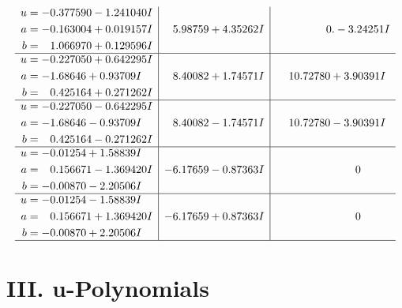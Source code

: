 \documentclass[1p]{elsarticle_modified}
\theoremstyle{definition}
\begin{document}
$$\begin{array}{c|c|c}
\begin{aligned}
u &= -0.377590 - 1.241040 I \\
a &= -0.163004 + 0.019157 I \\
b &= \phantom{-}1.066970 + 0.129596 I\end{aligned}
 & \phantom{-}5.98759 + 4.35262 I & \phantom{-0.000000 } 0. - 3.24251 I \\ \hline\begin{aligned}
u &= -0.227050 + 0.642295 I \\
a &= -1.68646 + 0.93709 I \\
b &= \phantom{-}0.425164 + 0.271262 I\end{aligned}
 & \phantom{-}8.40082 + 1.74571 I & \phantom{-}10.72780 + 3.90391 I \\ \hline\begin{aligned}
u &= -0.227050 - 0.642295 I \\
a &= -1.68646 - 0.93709 I \\
b &= \phantom{-}0.425164 - 0.271262 I\end{aligned}
 & \phantom{-}8.40082 - 1.74571 I & \phantom{-}10.72780 - 3.90391 I \\ \hline\begin{aligned}
u &= -0.01254 + 1.58839 I \\
a &= \phantom{-}0.156671 - 1.369420 I \\
b &= -0.00870 - 2.20506 I\end{aligned}
 & -6.17659 - 0.87363 I & \phantom{-0.000000 } 0 \\ \hline\begin{aligned}
u &= -0.01254 - 1.58839 I \\
a &= \phantom{-}0.156671 + 1.369420 I \\
b &= -0.00870 + 2.20506 I\end{aligned}
 & -6.17659 + 0.87363 I & \phantom{-0.000000 } 0\\
 \hline 
 \end{array}$$\newpage
\newpage\renewcommand{\arraystretch}{1}
\centering \section*{ III. u-Polynomials}
\end{document}
